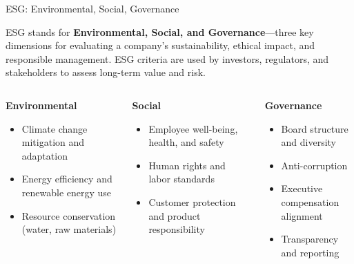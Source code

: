 \documentclass[aspectratio=169, 10pt]{beamer}
\begin{document}
\begin{frame}{ESG: Environmental, Social, Governance}

\begin{tcolorbox}[colback=WHUblue!5!white, colframe=WHUblue, title=Definition, fonttitle=\bfseries, sharp corners=south]
ESG stands for \textbf{Environmental, Social, and Governance}—three key dimensions for evaluating a company’s sustainability, ethical impact, and responsible management. ESG criteria are used by investors, regulators, and stakeholders to assess long-term value and risk.
\end{tcolorbox}
\vspace{1em}
\begin{columns}[T,onlytextwidth]
  \begin{column}{0.33\textwidth}
    \textcolor{WHUblue}{\textbf{Environmental}}
    \begin{itemize}
      \item Climate change mitigation and adaptation
      \item Energy efficiency and renewable energy use
      \item Resource conservation (water, raw materials)
    \end{itemize}
  \end{column}
  \begin{column}{0.33\textwidth}
    \textcolor{WHUblue}{\textbf{Social}}
    \begin{itemize}
      \item Employee well-being, health, and safety
      \item Human rights and labor standards
      \item Customer protection and product responsibility
    \end{itemize}
  \end{column}
  \begin{column}{0.33\textwidth}
    \textcolor{WHUblue}{\textbf{Governance}}
    \begin{itemize}
      \item Board structure and diversity
      \item Anti-corruption
      \item Executive compensation alignment
      \item Transparency and reporting
    \end{itemize}
  \end{column}
\end{columns}
\end{frame}
\end{document}

